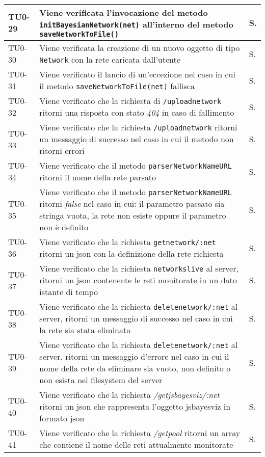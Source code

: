\begin{longtable}{|C{.15\textwidth}|m{.66\textwidth}|C{.10\textwidth}|}
\hline 
{}TU0-29 & Viene verificata l'invocazione del metodo \texttt{initBayesianNetwork(net)} all'interno del metodo \texttt{saveNetworkToFile()} & S. \\ 
\hline 
TU0-30 & Viene verificata la creazione di un nuovo oggetto di tipo \texttt{Network} con la rete caricata dall'utente & S. \\ 
\hline
{} TU0-31 & Viene verificato il lancio di un'eccezione nel caso in cui il metodo \texttt{saveNetworkToFile(net)} fallisca & S. \\
\hline
TU0-32 & Viene verificato che la richiesta di \texttt{/uploadnetwork} ritorni una risposta con stato \textit{404} in caso di fallimento & S. \\ 
\hline
{} TU0-33 & Viene verificato che la richiesta \texttt{/uploadnetwork} ritorni un messaggio di successo nel caso in cui il metodo non ritorni errori & S. \\
\hline
TU0-34 & Viene verificato che il metodo \texttt{parserNetworkNameURL} ritorni il nome della rete parsato & S. \\ 
\hline 
{}TU0-35 & Viene verificato che il metodo \texttt{parserNetworkNameURL} ritorni \textit{false} nel caso in cui: il parametro passato sia stringa vuota, la rete non esiste oppure il parametro non è definito & S. \\ 
\hline 
TU0-36 & Viene verificato che la richiesta \texttt{getnetwork/:net} ritorni un json con la definizione della rete richiesta & S. \\ 
 \hline
{}TU0-37 & Viene verificato che la richiesta \texttt{networkslive} al server, ritorni un json contenente le reti monitorate in un dato istante di tempo & S. \\ 
 \hline 
 TU0-38 & Viene verificato che la richiesta \texttt{deletenetwork/:net} al server, ritorni un messaggio di successo nel caso in cui la rete sia stata eliminata & S. \\
 \hline
 TU0-39 & Viene verificato che la richiesta \texttt{deletenetwork/:net} al server, ritorni un messaggio d'errore nel caso in cui il nome della rete da eliminare sia vuoto,  non definito o non esista nel filesystem del server & S. \\ 
\hline
TU0-40 & Viene verificato che la richiesta \textit{/getjsbayesviz/:net} ritorni un json che rappresenta l'oggetto jsbayesviz in formato json & S.\\
 \hline
{}TU0-41 & Viene verificato che la richiesta \textit{/getpool} ritorni un array che contiene il nome delle reti attualmente monitorate & S.\\

\end{longtable}
